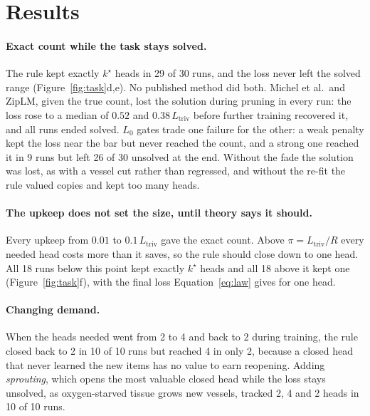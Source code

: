 \documentclass[letterpaper]{article} %
\newcommand{\Ltriv}{L_{\mathrm{triv}}}
\newcommand{\kstar}{k^\star}
\begin{document}
\section{Results}

\paragraph{Exact count while the task stays solved.} The rule kept exactly $\kstar$ heads in 29 of 30 runs, and the loss never left the solved range (Figure~\ref{fig:task}d,e). No published method did both. Michel et al.\ and ZipLM, given the true count, lost the solution during pruning in every run: the loss rose to a median of $0.52$ and $0.38\,\Ltriv$ before further training recovered it, and all runs ended solved. $L_0$ gates trade one failure for the other: a weak penalty kept the loss near the bar but never reached the count, and a strong one reached it in 9 runs but left 26 of 30 unsolved at the end. Without the fade the solution was lost, as with a vessel cut rather than regressed, and without the re-fit the rule valued copies and kept too many heads. 

\paragraph{The upkeep does not set the size, until theory says it should.} Every upkeep from $0.01$ to $0.1\,\Ltriv$ gave the exact count. Above $\pi=\Ltriv/R$ every needed head costs more than it saves, so the rule should close down to one head. All 18 runs below this point kept exactly $\kstar$ heads and all 18 above it kept one (Figure~\ref{fig:task}f), with the final loss Equation~\eqref{eq:law} gives for one head.

\paragraph{Changing demand.} When the heads needed went from 2 to 4 and back to 2 during training, the rule closed back to 2 in 10 of 10 runs but reached 4 in only 2, because a closed head that never learned the new items has no value to earn reopening. Adding \emph{sprouting}, which opens the most valuable closed head while the loss stays unsolved, as oxygen-starved tissue grows new vessels, tracked 2, 4 and 2 heads in 10 of 10 runs.
\end{document}

